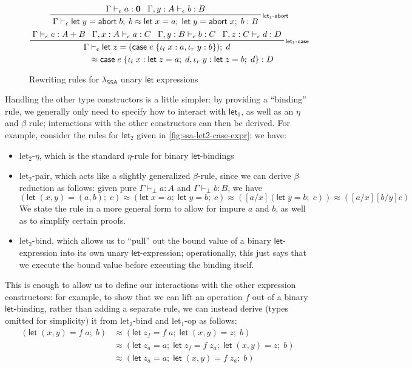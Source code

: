 \documentclass[acmsmall,screen,review]{acmart}
\newcommand{\mb}[1]{\ensuremath{\mathbf{#1}}}
\newcommand{\ms}[1]{\ensuremath{\mathsf{#1}}}
\newcommand{\lto}{:}
\newcommand{\linl}[1]{\iota_l\;{#1}}
\newcommand{\linr}[1]{\iota_r\;{#1}}
\newcommand{\labort}[1]{\ms{abort}\;{#1}}
\newcommand{\letexpr}[3]{\ensuremath{\ms{let}\;#1 = #2;\;#3}}
\newcommand{\caseexpr}[5]{\ms{case}\;#1\;\{\linl{#2} \lto #3, \linr{#4} \lto #5\}}
\newcommand{\bhyp}[2]{#1 : #2}
\newcommand{\rle}[1]{{\scriptsize\textsf{#1}}}
\newcommand{\hasty}[4]{#1 \vdash_{#2} #3: {#4}}
\newcommand{\teqv}{\approx}
\newcommand{\tmeq}[5]{#1 \vdash_{#2} #3 \teqv #4 : {#5}}
\newcommand{\brle}[1]{{\textsf{#1}}}
\newcommand{\isotopessa}{\(\lambda_{\ms{SSA}}\)}
\begin{document}
\begin{figure}
\begin{gather*}
    \prftree[r]{\rle{let$_1$-abort}}
      {\hasty{\Gamma}{\epsilon}{a}{\mb{0}}}
      {\hasty{\Gamma, \bhyp{y}{A}}{\epsilon}{b}{B}}
      {\tmeq{\Gamma}{\epsilon}
        {\letexpr{y}{\labort{b}}{b}}
        {\letexpr{x}{a}{\letexpr{y}{\labort{x}}{b}}}{B}}
    \\
    \prftree[r]{\rle{let$_1$-case}}
      {\hasty{\Gamma}{\epsilon}{e}{A + B}}
      {\hasty{\Gamma, \bhyp{x}{A}}{\epsilon}{a}{C}}
      {\hasty{\Gamma, \bhyp{y}{B}}{\epsilon}{b}{C}}
      {\hasty{\Gamma, \bhyp{z}{C}}{\epsilon}{d}{D}}
      { 
        \prfStackPremises
        {\Gamma \vdash_\epsilon \letexpr{z}{(\caseexpr{e}{x}{a}{y}{b})}{d}}
        {\hspace{6em} \teqv \caseexpr{e}{x}{\letexpr{z}{a}{d}}{y}{\letexpr{z}{b}{d}} : D}
      }
  \end{gather*}
  \Description{}
  \caption{Rewriting rules for \isotopessa{} unary \ms{let} expressions}
  \label{fig:ssa-unary-let-expr}
\end{figure}

Handling the other type constructors is a little simpler: by providing a ``binding'' rule, we
generally only need to specify how to interact with $\ms{let}_1$, as well as an $\eta$ and $\beta$
rule; interactions with the other constructors can then be derived. For example, consider the rules
for $\ms{let}_2$ given in \ref{fig:ssa-let2-case-expr}; we have:
\begin{itemize}
  \item \brle{let$_2$-$\eta$}, which is the standard $\eta$-rule for binary \ms{let}-bindings
  \item \brle{let$_2$-pair}, which acts like a slightly generalized $\beta$-rule, since we can
  derive $\beta$ reduction as follows: given pure $\hasty{\Gamma}{\bot}{a}{A}$ and
  $\hasty{\Gamma}{\bot}{b}{B}$, we have
  $$
  (\letexpr{(x, y)}{(a, b)}{c}) 
  \teqv (\letexpr{x}{a}{\letexpr{y}{b}{c}})
  \teqv ([a/x](\letexpr{y}{b}{c}))
  \teqv ([a/x][b/y]c)
  $$
  We state the rule in a more general form to allow for impure $a$ and $b$, as well as to simplify
  certain proofs.
  \item \brle{let$_2$-bind}, which allows us to ``pull'' out the bound value of a binary
  \ms{let}-expression into its own unary \ms{let}-expression; operationally, this just says that
  we execute the bound value before executing the binding itself.
\end{itemize}
This is enough to allow us to define our interactions with the other expression constructors: for
example, to show that we can lift an operation $f$ out of a binary $\ms{let}$-binding, rather than
adding a separate rule, we can instead derive (types omitted for simplicity) it from
\brle{let$_2$-bind} and \brle{let$_1$-op} as follows:
\begin{align*}
  (\letexpr{(x, y)}{f\;a}{b})
  &\teqv (\letexpr{z_f}{f\;a}{\letexpr{(x, y)}{z}{b}}) \\
  &\teqv (\letexpr{z_a}{a}{\letexpr{z_f}{f\;z_a}{\letexpr{(x, y)}{z}{b}}}) \\
  &\teqv (\letexpr{z_a}{a}{\letexpr{(x, y)}{f\;z_a}{b}})
\end{align*}
\end{document}

